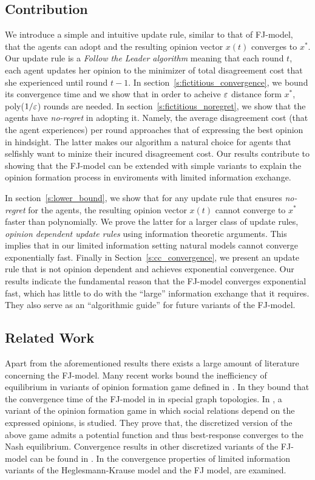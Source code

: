 \subsection{Contribution}
We introduce a simple and intuitive update rule,
similar to that of FJ-model, that the agents can adopt
and the resulting opinion vector $x(t)$ converges to $x^*$.
Our update rule is a \emph{Follow the Leader algorithm}
meaning that each round $t$, each agent updates her opinion
to the minimizer of total disagreement cost that
she experienced until round $t-1$. In section~\ref{s:fictitious_convergence},
we bound its convergence time and we show that in order
to acheive $\varepsilon$ distance form $x^*$, poly($1/\varepsilon$) rounds
are needed. In section~\ref{s:fictitious_noregret},
we show that the agents have \emph{no-regret} in adopting
it. Namely, the average disagreement cost (that
the agent experiences) per round approaches that
of expressing the best opinion in hindsight. The latter
makes our algorithm a natural choice for agents that
selfishly want to minize their incured disagreement cost.
Our results contribute to showing that the FJ-model
can be extended with simple variants to explain
the opinion formation process in enviroments with limited
information exchange.

In section~\ref{s:lower_bound}, we show
that for any update rule that ensures \emph{no-regret}
for the agents, the resulting opinion vector $x(t)$
cannot converge to $x^*$ faster than polynomially. We
prove the latter for a larger class of update rules,
\emph{opinion dependent update rules} using information
theoretic arguments. This implies that in our limited
information setting natural models cannot converge exponentially
fast. Finally in Section~\ref{s:cc_convergence}, we present
an update rule that is not opinion dependent and achieves exponential
convergence. Our results indicate the fundamental reason that
the FJ-model converges exponential fast, which has little
to do with the \enquote{large} information exchange that it requires.
They also serve as an \enquote{algorithmic guide} for future
variants of the FJ-model.

\subsection{Related Work}
Apart from the aforementioned results there exists a large amount
of literature concerning the FJ-model.
Many recent works \cite{BGM13,CKO13,BFM16,EFHS17} bound the
inefficiency of equilibrium in variants of opinion formation game
defined in \cite{BKO11}. In \cite{GS14} they bound that the convergence
time of the FJ-model in in special graph topologies.
In \cite{BFM16}, a variant of the opinion formation game in which social
relations depend on the expressed opinions, is studied.
They prove that, the discretized version of the above game admits
a potential function and thus best-response converges to the
Nash equilibrium. Convergence results in other discretized variants of
the FJ-model can be found in \cite{YOASS13,FGV16}. In \cite{FPS16} the convergence
properties of limited information variants of the Heglesmann-Krause model \cite{HK}
and the FJ model, are examined.


